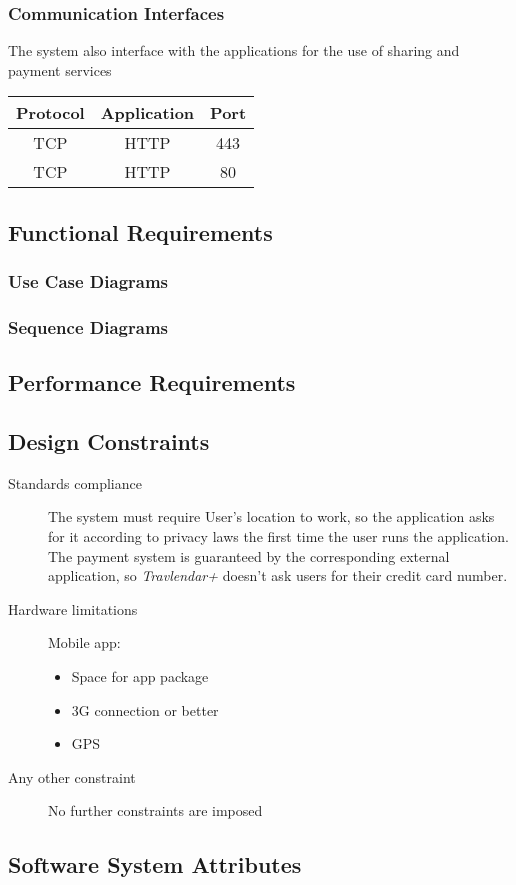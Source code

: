 	\subsubsection{Communication Interfaces}
		The system also interface with the applications for the use of sharing and payment services
		\hfill
		\begin{tabular}{| c | c | c |}
			\hline
			Protocol	& Application	& Port \\
			\hline
			\hline
			TCP		& HTTP		& 443 \\
			\hline
			TCP		& HTTP		& 80 \\
			\hline
		\end{tabular}
	
\subsection{Functional Requirements}
	
	
	\subsubsection{Use Case Diagrams}
		

	\subsubsection{Sequence Diagrams}
				
			
\subsection{Performance Requirements}
		
		
\subsection{Design Constraints}
		\begin{description}
			\item[Standards compliance]
			The system must require User’s location to work, so the application asks for it according to privacy laws the first time the user runs the application.
			The payment system is guaranteed by the corresponding external application, so \textit{Travlendar+} doesn’t ask users for their credit card number.

			\item[Hardware limitations]
			Mobile app:
			\begin{itemize}
			\item Space for app package
			\item 3G connection or better
			\item GPS
		\end{itemize}

			\item[Any other constraint]
			No further constraints are imposed
\end{description}
		
\subsection{Software System Attributes}
	
